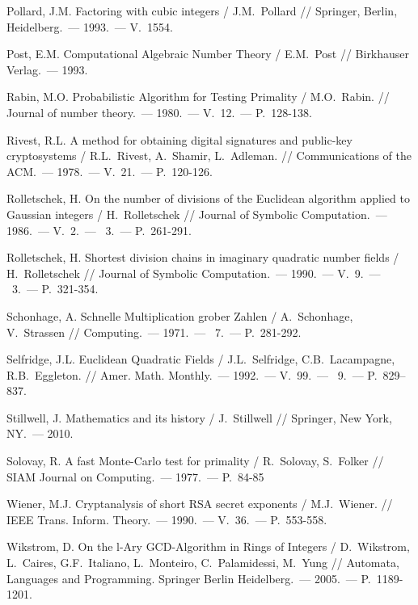 \documentclass[_00_dissertation.tex]{subfiles}
\begin{document}
\begin{thebibliography}{99}
    Pollard, J.M. Factoring with cubic integers / J.M.~Pollard // Springer, Berlin, Heidelberg.~--- 1993.~--- V.~1554.

    Post, E.M. Computational Algebraic Number Theory / E.M.~Post // Birkhauser Verlag.~--- 1993.

    Rabin, M.O. Probabilistic Algorithm for Testing Primality / M.O.~Rabin. // Journal of number theory.~--- 1980.~--- V.~12.~--- P.~128-138.
    
    Rivest, R.L. A method for obtaining digital signatures and public-key cryptosystems / R.L.~Rivest, A.~Shamir, L.~Adleman. // Communications of the ACM.~--- 1978.~--- V.~21.~--- P.~120-126.
    
    Rolletschek, H. On the number of divisions of the Euclidean algorithm applied to Gaussian integers / H.~Rolletschek // Journal of Symbolic Computation.~--- 1986.~--- V.~2.~--- \textnumero~3.~--- P.~261-291.
    
    Rolletschek, H. Shortest division chains in imaginary quadratic number fields / H.~Rolletschek // Journal of Symbolic Computation.~--- 1990.~--- V.~9.~--- \textnumero~3.~--- P.~321-354.

    Schonhage, A. Schnelle Multiplication grober Zahlen / A.~Schonhage, V.~Strassen // Computing.~--- 1971.~--- \textnumero~7.~--- P.~281-292.

    Selfridge, J.L. Euclidean Quadratic Fields / J.L.~Selfridge, C.B.~Lacampagne, R.B.~Eggleton. // Amer. Math. Monthly.~--- 1992.~--- V.~99.~--- \textnumero~9.~--- P.~829--837.

    Stillwell, J. Mathematics and its history / J.~Stillwell // Springer, New York, NY.~--- 2010.

    Solovay, R. A fast Monte-Carlo test for primality / R.~Solovay, S.~Folker // SIAM Journal on Computing.~--- 1977.~--- P.~84-85
    
    Wiener, M.J. Cryptanalysis of short RSA secret exponents / M.J.~Wiener. // IEEE Trans. Inform. Theory.~--- 1990.~--- V.~36.~--- P.~553-558.

    Wikstrom, D. On the l-Ary GCD-Algorithm in Rings of Integers / D.~Wikstrom, L.~Caires, G.F.~Italiano, L.~Monteiro, C.~Palamidessi, M.~Yung // Automata, Languages and Programming. Springer Berlin Heidelberg.~--- 2005.~--- P.~1189-1201.

\end{thebibliography}
\end{document}
